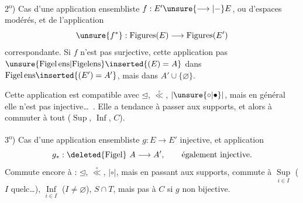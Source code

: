 2\textsuperscript{o}) Cas d'une application ensembliste  $f:E'\unsure{\longrightarrow|{-}}E$, ou d'espaces modérés\inserted{\ldots}, et de l'application
\[
\unsure{f^*}:\operatorname{Figures}(E)\longrightarrow\operatorname{Figures}(E')
\]
correspondante. Si $f$ n'est pas surjective, cette application  pas $\unsure{\mathrm{Figel}\,\mathrm{ens}|\mathrm{Figelens}}\inserted{(E)=A}$ dans $\mathrm{Figel}\,\mathrm{ens}\inserted{(E')=A'}$, mais dans  $A'\cup\{\varnothing\}$.

Cette application est compatible avec $\unlhd$, $\overset{\circ}{\ll}$, $|\unsure{\circ|\bullet}|$, mais en général elle n'est pas injective\ldots\ . Elle a tendance à passer aux supports, et alors à commuter à tout ($\operatorname{Sup}$, $\operatorname{Inf}$, $C$).

3\textsuperscript{o}) Cas d'une application ensembliste $g:E\longrightarrow E'$\unsure{,|*} injective, et application
\[
g_*:\deleted{\mathrm{Figel}}\ A\longrightarrow A',\qquad\text{également injective.}
\]
Commute encore à : $\unlhd$, $\overset{\circ}{\ll}$, $|\circ|$, mais en passant aux supports, commute à $\underset{i\in I}{\operatorname{Sup}}$ ($I$ quelc\ldots), $\underset{i\in I}{\operatorname{Inf}}$ ($I\ne\varnothing$), $S\cap T$, mais pas à $C$ si $g$ non bijective.

